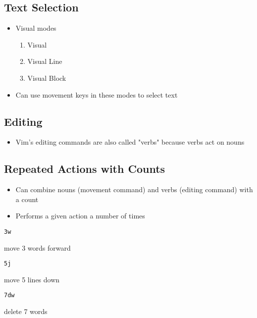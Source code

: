 \documentclass[letterpaper,12pt]{article}
\newcommand*{\lstitem}[1]{
  \setbox0\hbox{\lstinline{#1}}
  \item[\usebox0]
}
\begin{document}
\subsection{Text Selection}
\begin{itemize}
 \item Visual modes
       \begin{enumerate}
        \item Visual
        \item Visual Line
        \item Visual Block
       \end{enumerate}
 \item Can use movement keys in these modes to select text
\end{itemize}

\subsection{Editing}
\begin{itemize}
 \item Vim's editing commands are also called "verbs" because verbs act on nouns
\end{itemize}


\subsection{Repeated Actions with Counts}
\begin{itemize}
 \item Can combine nouns (movement command) and verbs (editing command) with a count
 \item Performs a given action a number of times
\end{itemize}

\begin{description}
 \lstitem{3w} move 3 words forward
 \lstitem{5j} move 5 lines down
 \lstitem{7dw} delete 7 words
\end{description}
\end{document}
